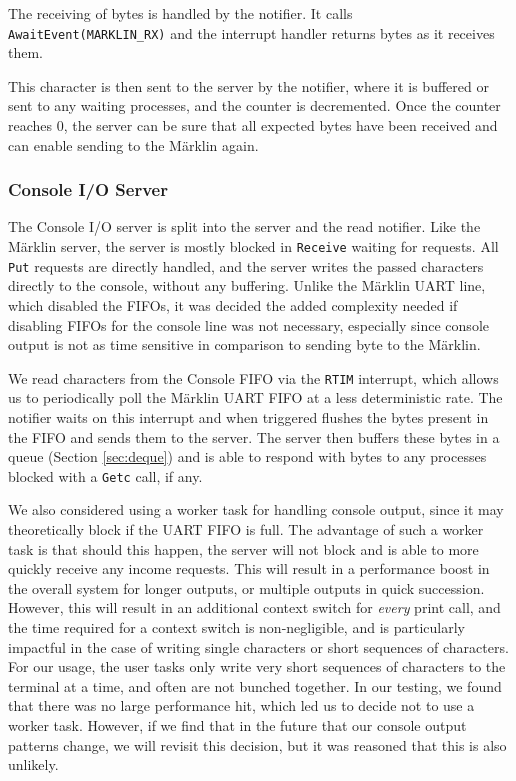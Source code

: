 \documentclass[12pt, titlepage]{article}
\begin{document}
    The receiving of bytes is handled by the notifier. It calls \verb'AwaitEvent(MARKLIN_RX)' and the interrupt handler returns bytes as it receives them.
    
    This character is then sent to the server by the notifier, where it is buffered or sent to any waiting processes, and the counter is decremented.
    Once the counter reaches 0, the server can be sure that all expected bytes have been received and can enable sending to the Märklin again. 

    \subsubsection{Console I/O Server}
    \label{sec:console-server}
    The Console I/O server is split into the server and the read notifier. 
    Like the Märklin server, the server is mostly blocked in \verb'Receive' waiting for requests. 
    All \verb'Put' requests are directly handled, and the server writes the passed characters directly to the console, without any buffering. 
    Unlike the Märklin UART line, which disabled the FIFOs, it was decided the added complexity needed if disabling FIFOs for the console line was not necessary, especially since console output is not as time sensitive in comparison to sending byte to the Märklin.

    We read characters from the Console FIFO via the \verb`RTIM` interrupt, which allows us to periodically poll the Märklin UART FIFO at a less deterministic rate.
    The notifier waits on this interrupt and when triggered flushes the bytes present in the FIFO and sends them to the server.
    The server then buffers these bytes in a queue (Section \ref{sec:deque}) and is able to respond with bytes to any processes blocked with a \verb`Getc` call, if any.
    
    We also considered using a worker task for handling console output, since it may theoretically block if the UART FIFO is full.
    The advantage of such a worker task is that should this happen, the server will not block and is able to more quickly receive any income requests.
    This will result in a performance boost in the overall system for longer outputs, or multiple outputs in quick succession.
    However, this will result in an additional context switch for \textit{every} print call, and the time required for a context switch is non-negligible, and is particularly impactful in the case of writing single characters or short sequences of characters.
    For our usage, the user tasks only write very short sequences of characters to the terminal at a time, and often are not bunched together.
    In our testing, we found that there was no large performance hit, which led us to decide not to use a worker task. However, if we find that in the future that our console output patterns change, we will revisit this decision, but it was reasoned that this is also unlikely.
\end{document}
